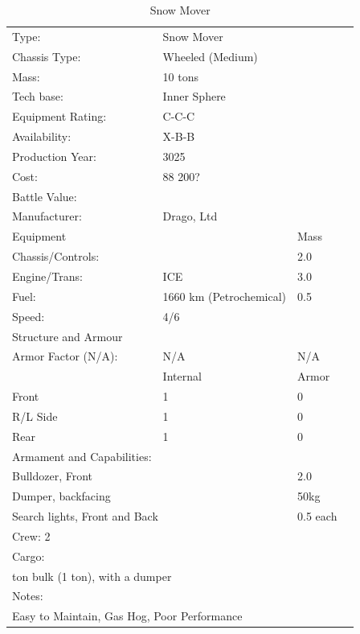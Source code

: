 \documentclass{tufte-book}
\begin{document}
\bigskip
\begin{table}
\begin{minipage}{\textwidth}
\begin{center}
\begin{tabular}{llll}
\toprule
Type: & Snow Mover & \\
Chassis Type: & Wheeled (Medium) & \\
Mass: & 10 tons & \\
Tech base: & Inner Sphere & \\
Equipment Rating: & C-C-C & \\
Availability: & X-B-B & \\
Production Year: & 3025 & \\
Cost: & 88 200? & \\
Battle Value: & & \\
Manufacturer: & Drago, Ltd & \\
Equipment & & Mass \\
\quad Chassis/Controls: & & 2.0 \\
\quad Engine/Trans: & ICE  & 3.0 \\
\quad Fuel: & 1660 km (Petrochemical) & 0.5 \\
\quad Speed: & \multicolumn{2}{l}{4/6} \\
Structure and Armour & & \\
\quad Armor Factor (N/A): & N/A & N/A \\
\quad & Internal & Armor \\
\quad Front & 1 & 0 \\
\quad R/L Side & 1 & 0 \\
\quad Rear & 1 & 0 \\
Armament and Capabilities: & & \\
\multicolumn{2}{l}{\quad Bulldozer, Front} & 2.0 \\
\multicolumn{2}{l}{\quad Dumper, backfacing} & 50kg \\
\multicolumn{2}{l}{\quad 2 Search lights, Front and Back} & 0.5 each \\

\multicolumn{3}{l}{Crew: 2} \\
Cargo: & & \\
\multicolumn{3}{l}{\quad 1 ton bulk (1 ton), with a dumper} \\

Notes: & & \\
\multicolumn{3}{l}{\quad Easy to Maintain, Gas Hog, Poor Performance} \\
\bottomrule
\end{tabular}
\end{center}
\end{minipage}
\caption{Snow Mover}
\end{table}
\end{document}
